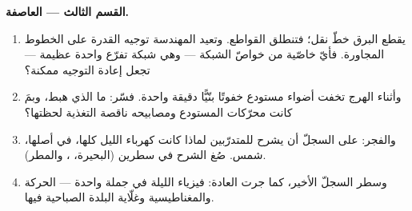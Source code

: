 \begin{problem}
\medskip\noindent\textbf{القسم الثالث --- العاصفة.}
\begin{enumerate}[resume]
  \item يقطع البرق خطّ نقل؛ فتنطلق القواطع. وتعيد المهندسة
        توجيه القدرة على الخطوط المجاورة. فأيّ خاصّية من
        خواصّ الشبكة --- وهي شبكة تفرّع واحدة عظيمة --- تجعل
        إعادة التوجيه ممكنة؟
  \item وأثناء الهرج تخفت أضواء مستودع خفوتًا بنّيًّا دقيقة
        واحدة. فسّر: ما الذي هبط، وبمَ كانت محرّكات المستودع
        ومصابيحه ناقصة التغذية لحظتها؟
  \item والفجر: على السجلّ أن يشرح للمتدرّبين لماذا كانت
        كهرباء الليل كلها، في أصلها،  شمس. صُغ الشرح في
        سطرين (البحيرة، ، والمطر).
  \item وسطر السجلّ الأخير، كما جرت العادة: فيزياء الليلة في
        جملة واحدة --- الحركة والمغناطيسية وغلّاية البلدة
        الصباحية فيها.
\end{enumerate}
\end{problem}
